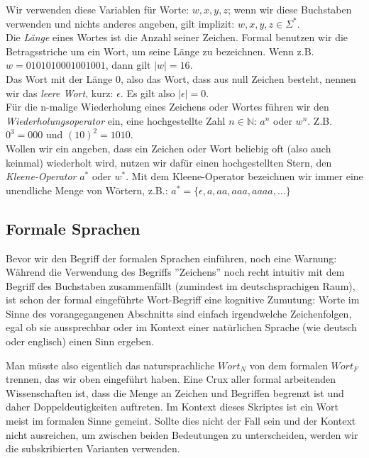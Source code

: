 \noindent
Wir verwenden diese Variablen für Worte:
$w, x, y, z$; wenn wir diese Buchstaben verwenden und nichts anderes angeben,
gilt implizit: $w, x, y, z \in \Sigma^*$.\\

\noindent
Die \emph{Länge} eines Wortes ist die Anzahl seiner Zeichen.
Formal benutzen wir die Betragsstriche um ein Wort, um seine
Länge zu bezeichnen. Wenn z.B. $w = 0101010001001001$, dann gilt $|w| = 16$.\\

\noindent
Das Wort mit der Länge 0, also das Wort, dass aus null Zeichen besteht,
nennen wir das \emph{leere Wort}, kurz: $\epsilon$.
Es gilt also $|\epsilon| = 0$.\\

\noindent
Für die n-malige Wiederholung eines Zeichens oder Wortes führen wir den \emph{Wiederholungsoperator}
ein, eine hochgestellte Zahl $n \in \mathbb{N}$: $a^n$ oder $w^n$.
Z.B. $0^3 = 000$ und $(10)^2 = 1010$.\\

\noindent
Wollen wir ein angeben, dass ein Zeichen oder Wort beliebig oft (also auch keinmal) wiederholt
wird, nutzen wir dafür einen hochgestellten Stern, den \emph{Kleene-Operator} $a^*$ oder $w^*$.
Mit dem Kleene-Operator bezeichnen wir immer eine unendliche Menge von Wörtern, z.B.:
$a^* = \{\epsilon, a, aa, aaa, aaaa, \dots\}$

\subsection{Formale Sprachen}

Bevor wir den Begriff der formalen Sprachen einführen, noch eine Warnung:
Während die Verwendung des Begriffs ''Zeichens''
noch recht intuitiv mit dem Begriff des Buchstaben zusammenfällt
(zumindest im deutschsprachigen Raum),  
ist schon der formal eingeführte Wort-Begriff eine kognitive Zumutung:
Worte im Sinne des vorangegangenen Abschnitts sind einfach irgendwelche Zeichenfolgen,
egal ob sie aussprechbar oder im Kontext einer natürlichen Sprache
(wie deutsch oder englisch) einen Sinn ergeben.

Man müsste also eigentlich das natursprachliche $Wort_N$ von dem formalen $Wort_F$ trennen,
das wir oben eingeführt haben.
Eine Crux aller formal arbeitenden Wissenschaften ist,
dass die Menge an Zeichen und Begriffen begrenzt ist und daher Doppeldeutigkeiten auftreten. 
Im Kontext dieses Skriptes ist ein Wort meist im formalen Sinne gemeint.
Sollte dies nicht der Fall sein und der Kontext nicht ausreichen,
um zwischen beiden Bedeutungen zu unterscheiden,
werden wir die subskribierten Varianten verwenden.

